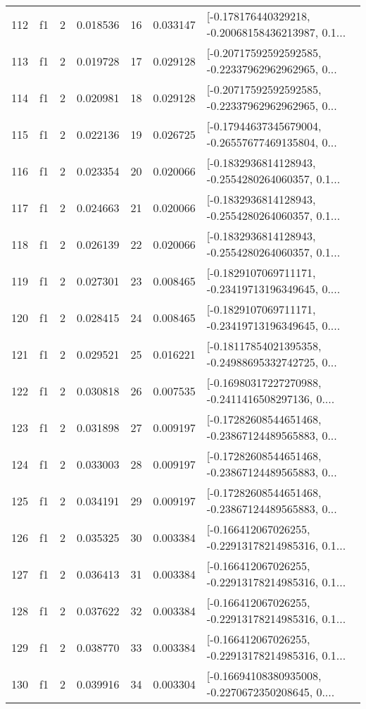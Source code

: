 \begin{tabular}{lllrlrl}
112 &  f1 &   2 &  0.018536 &   16 &  0.033147 &  [-0.178176440329218, -0.20068158436213987, 0.1... \\
113 &  f1 &   2 &  0.019728 &   17 &  0.029128 &  [-0.20717592592592585, -0.22337962962962965, 0... \\
114 &  f1 &   2 &  0.020981 &   18 &  0.029128 &  [-0.20717592592592585, -0.22337962962962965, 0... \\
115 &  f1 &   2 &  0.022136 &   19 &  0.026725 &  [-0.17944637345679004, -0.26557677469135804, 0... \\
116 &  f1 &   2 &  0.023354 &   20 &  0.020066 &  [-0.1832936814128943, -0.2554280264060357, 0.1... \\
117 &  f1 &   2 &  0.024663 &   21 &  0.020066 &  [-0.1832936814128943, -0.2554280264060357, 0.1... \\
118 &  f1 &   2 &  0.026139 &   22 &  0.020066 &  [-0.1832936814128943, -0.2554280264060357, 0.1... \\
119 &  f1 &   2 &  0.027301 &   23 &  0.008465 &  [-0.1829107069711171, -0.23419713196349645, 0.... \\
120 &  f1 &   2 &  0.028415 &   24 &  0.008465 &  [-0.1829107069711171, -0.23419713196349645, 0.... \\
121 &  f1 &   2 &  0.029521 &   25 &  0.016221 &  [-0.18117854021395358, -0.24988695332742725, 0... \\
122 &  f1 &   2 &  0.030818 &   26 &  0.007535 &  [-0.16980317227270988, -0.2411416508297136, 0.... \\
123 &  f1 &   2 &  0.031898 &   27 &  0.009197 &  [-0.17282608544651468, -0.23867124489565883, 0... \\
124 &  f1 &   2 &  0.033003 &   28 &  0.009197 &  [-0.17282608544651468, -0.23867124489565883, 0... \\
125 &  f1 &   2 &  0.034191 &   29 &  0.009197 &  [-0.17282608544651468, -0.23867124489565883, 0... \\
126 &  f1 &   2 &  0.035325 &   30 &  0.003384 &  [-0.166412067026255, -0.22913178214985316, 0.1... \\
127 &  f1 &   2 &  0.036413 &   31 &  0.003384 &  [-0.166412067026255, -0.22913178214985316, 0.1... \\
128 &  f1 &   2 &  0.037622 &   32 &  0.003384 &  [-0.166412067026255, -0.22913178214985316, 0.1... \\
129 &  f1 &   2 &  0.038770 &   33 &  0.003384 &  [-0.166412067026255, -0.22913178214985316, 0.1... \\
130 &  f1 &   2 &  0.039916 &   34 &  0.003304 &  [-0.16694108380935008, -0.2270672350208645, 0.... \\

\end{tabular}
